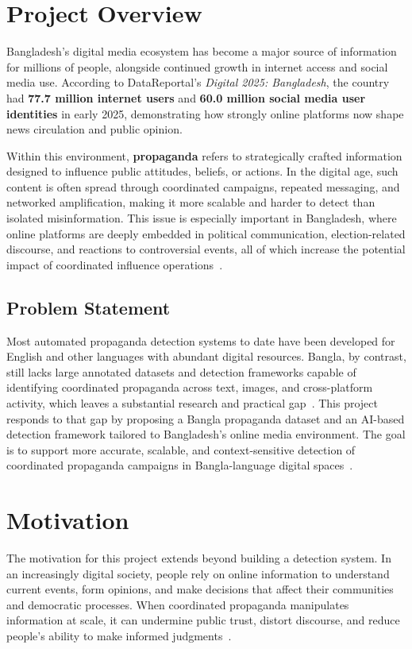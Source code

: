 \documentclass[12pt,a4paper]{report}
\begin{document}
\section{Project Overview}
Bangladesh's digital media ecosystem has become a major source of information for
millions of people, alongside continued growth in internet access and social media
use. According to DataReportal's \emph{Digital 2025: Bangladesh}, the country had
\textbf{77.7 million internet users} and \textbf{60.0 million social media user
identities} in early 2025, demonstrating how strongly online platforms now shape
news circulation and public opinion.

Within this environment, \textbf{propaganda} refers to strategically crafted
information designed to influence public attitudes, beliefs, or actions. In the
digital age, such content is often spread through coordinated campaigns, repeated
messaging, and networked amplification, making it more scalable and harder to
detect than isolated misinformation. This issue is especially important in
Bangladesh, where online platforms are deeply embedded in political communication,
election-related discourse, and reactions to controversial events, all of which
increase the potential impact of coordinated influence operations~\cite{hristakieva2022}.

\subsection*{Problem Statement}
Most automated propaganda detection systems to date have been developed for English
and other languages with abundant digital resources. Bangla, by contrast, still
lacks large annotated datasets and detection frameworks capable of identifying
coordinated propaganda across text, images, and cross-platform activity, which
leaves a substantial research and practical gap~\cite{hossain2020}. This project
responds to that gap by proposing a Bangla propaganda dataset and an AI-based
detection framework tailored to Bangladesh's online media environment. The goal is
to support more accurate, scalable, and context-sensitive detection of coordinated
propaganda campaigns in Bangla-language digital spaces~\cite{hossain2020,kamruzzaman2023}.

\section{Motivation}
The motivation for this project extends beyond building a detection system. In an
increasingly digital society, people rely on online information to understand
current events, form opinions, and make decisions that affect their communities and
democratic processes. When coordinated propaganda manipulates information at scale,
it can undermine public trust, distort discourse, and reduce people's ability to
make informed judgments~\cite{hristakieva2022}.
\end{document}
